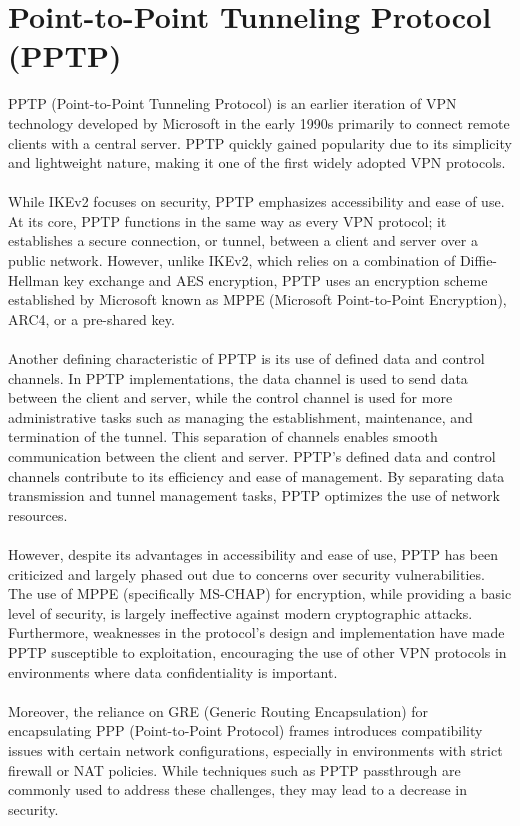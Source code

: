\documentclass[runningheads]{llncs}
\begin{document}
\section{Point-to-Point Tunneling Protocol (PPTP)}
PPTP (Point-to-Point Tunneling Protocol) is an earlier iteration of VPN technology developed by Microsoft in the early 1990s primarily to connect remote clients with a central server. PPTP quickly gained popularity due to its simplicity and lightweight nature, making it one of the first widely adopted VPN protocols. \cite{ms_pptp}\\
\\
While IKEv2 focuses on security, PPTP emphasizes accessibility and ease of use. At its core, PPTP functions in the same way as every VPN protocol; it establishes a secure connection, or tunnel, between a client and server over a public network. However, unlike IKEv2, which relies on a combination of Diffie-Hellman key exchange and AES encryption, PPTP uses an encryption scheme established by Microsoft known as MPPE (Microsoft Point-to-Point Encryption), ARC4, or a pre-shared key.\\
\\
Another defining characteristic of PPTP is its use of defined data and control channels. In PPTP implementations, the data channel is used to send data between the client and server, while the control channel is used for more administrative tasks such as managing the establishment, maintenance, and termination of the tunnel. This separation of channels enables smooth communication between the client and server. PPTP’s defined data and control channels contribute to its efficiency and ease of management. By separating data transmission and tunnel management tasks, PPTP optimizes the use of network resources.\\
\\
However, despite its advantages in accessibility and ease of use, PPTP has been criticized and largely phased out due to concerns over security vulnerabilities. The use of MPPE (specifically MS-CHAP) for encryption, while providing a basic level of security, is largely ineffective against modern cryptographic attacks. Furthermore, weaknesses in the protocol’s design and implementation have made PPTP susceptible to exploitation, encouraging the use of other VPN protocols in environments where data confidentiality is important.\\
\\
Moreover, the reliance on GRE (Generic Routing Encapsulation) for encapsulating PPP (Point-to-Point Protocol) frames introduces compatibility issues with certain network configurations, especially in environments with strict firewall or NAT policies. While techniques such as PPTP passthrough are commonly used to address these challenges, they may lead to a decrease in security.
\end{document}
